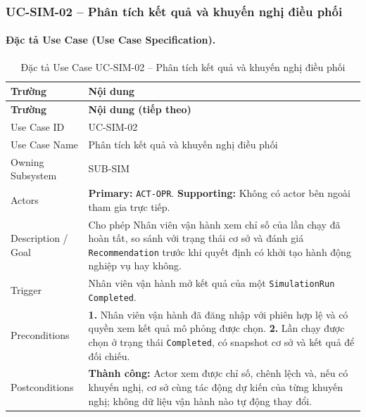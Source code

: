 \clearpage
\subsubsection{UC-SIM-02 -- Phân tích kết quả và khuyến nghị điều phối}


\paragraph{Đặc tả Use Case (Use Case Specification).}
\small
\begin{longtable}{|L{42mm}|L{102mm}|}
  \caption{Đặc tả Use Case UC-SIM-02 -- Phân tích kết quả và khuyến nghị điều phối}\label{tab:spec-UC-SIM-02}\\
  \hline
  \centering\arraybackslash\textbf{Trường} & \centering\arraybackslash\textbf{Nội dung}\\
  \hline
  \endfirsthead
  \hline
  \centering\arraybackslash\textbf{Trường} & \centering\arraybackslash\textbf{Nội dung (tiếp theo)}\\
  \hline
  \endhead
  Use Case ID & UC-SIM-02\\\hline
  Use Case Name & Phân tích kết quả và khuyến nghị điều phối\\\hline
  Owning Subsystem & SUB-SIM\\\hline
  Actors & \textbf{Primary:} \texttt{ACT-OPR}. \textbf{Supporting:} Không có actor bên ngoài tham gia trực tiếp.\\\hline
  Description / Goal & Cho phép Nhân viên vận hành xem chỉ số của lần chạy đã hoàn tất, so sánh với trạng thái cơ sở và đánh giá \texttt{Recommendation} trước khi quyết định có khởi tạo hành động nghiệp vụ hay không.\\\hline
  Trigger & Nhân viên vận hành mở kết quả của một \texttt{SimulationRun} \texttt{Completed}.\\\hline
  Preconditions &
    \textbf{1.} Nhân viên vận hành đã đăng nhập với phiên hợp lệ và có quyền xem kết quả mô phỏng được chọn.\newline
    \textbf{2.} Lần chạy được chọn ở trạng thái \texttt{Completed}, có snapshot cơ sở và kết quả để đối chiếu.\\\hline
  Postconditions &
    \textbf{Thành công:} Actor xem được chỉ số, chênh lệch và, nếu có khuyến nghị, cơ sở cùng tác động dự kiến của từng khuyến nghị; không dữ liệu vận hành nào tự động thay đổi.\newline

\end{longtable}
